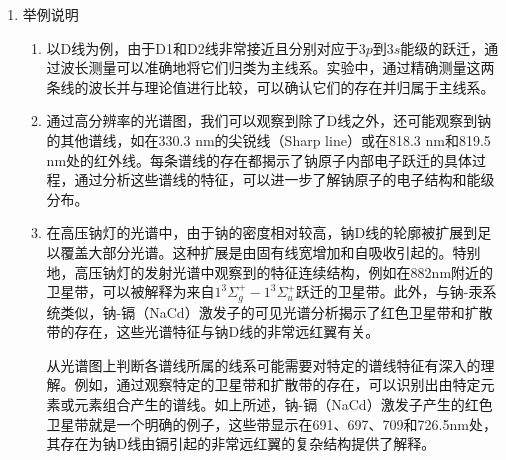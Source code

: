 \documentclass[dvipsnames, svgnames,a4paper,11pt]{article}
\begin{document}
\begin{enumerate}
		\item 举例说明
		\begin{enumerate}
			\item 以D线为例，由于D1和D2线非常接近且分别对应于$3p$到$3s$能级的跃迁，通过波长测量可以准确地将它们归类为主线系。实验中，通过精确测量这两条线的波长并与理论值进行比较，可以确认它们的存在并归属于主线系。
			\item 通过高分辨率的光谱图，我们可以观察到除了D线之外，还可能观察到钠的其他谱线，如在330.3 nm的尖锐线（Sharp line）或在818.3 nm和819.5 nm处的红外线。每条谱线的存在都揭示了钠原子内部电子跃迁的具体过程，通过分析这些谱线的特征，可以进一步了解钠原子的电子结构和能级分布。
			\item 在高压钠灯的光谱中，由于钠的密度相对较高，钠D线的轮廓被扩展到足以覆盖大部分光谱。这种扩展是由固有线宽增加和自吸收引起的。特别地，高压钠灯的发射光谱中观察到的特征连续结构，例如在882nm附近的卫星带，可以被解释为来自$1 ^3\Sigma^+_g - 1 ^3\Sigma^+_u$跃迁的卫星带。此外，与钠-汞系统类似，钠-镉（NaCd）激发子的可见光谱分析揭示了红色卫星带和扩散带的存在，这些光谱特征与钠D线的非常远红翼有关。
			
			从光谱图上判断各谱线所属的线系可能需要对特定的谱线特征有深入的理解。例如，通过观察特定的卫星带和扩散带的存在，可以识别出由特定元素或元素组合产生的谱线。如上所述，钠-镉（NaCd）激发子产生的红色卫星带就是一个明确的例子，这些带显示在691、697、709和726.5nm处，其存在为钠D线由镉引起的非常远红翼的复杂结构提供了解释。
			
		\end{enumerate}
	\end{enumerate}
	
\end{document}
